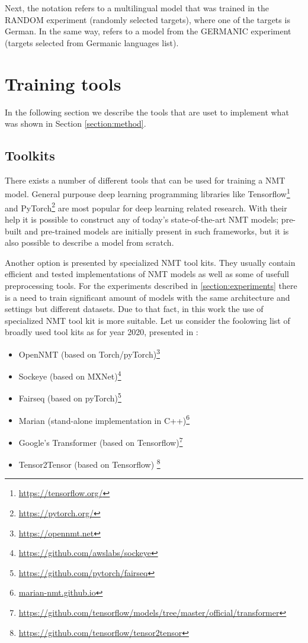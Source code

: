 Next, the  notation refers to a multilingual
model that was trained in the RANDOM experiment (randomly selected targets),
where one of the targets is German.
In the same way,  refers to a model from
the GERMANIC experiment (targets selected from Germanic languages list).


\section{Training tools}

In the following section we describe the tools that are uset to implement
what was shown in Section \ref{section:method}.

\subsection{Toolkits}

There exists a number of different tools that can be used for training a NMT model.
General purpouse deep learning programming libraries like
Tensorflow\footnote{\url{https://tensorflow.org/}} and
PyTorch\footnote{\url{https://pytorch.org/}} are most popular for deep learning related
research. With their help it is possible to construct any of today's state-of-the-art
NMT models; pre-built and pre-trained models are initially present in such frameworks,
but it is also possible to describe a model from scratch.

Another option is presented by specialized NMT tool kits.
They usually contain efficient and tested implementations of NMT models as well as some of
usefull preprocessing tools.
For the experiments described in \ref{section:experiments} there is a need to train significant
amount of models with the same architecture and settings but different datasets.
Due to that fact, in this work the use of specialized NMT tool kit is more suitable.
Let us consider the foolowing list of broadly used tool kits as for year 2020,
presented in \cite{koehn_2020}:

\begin{itemize}
  \item OpenNMT (based on Torch/pyTorch)\footnote{\url{https://opennmt.net}}
  \item Sockeye (based on MXNet)\footnote{\url{https://github.com/awslabs/sockeye}}
  \item Fairseq (based on pyTorch)\footnote{\url{https://github.com/pytorch/fairseq}}
  \item Marian (stand-alone implementation in C++)\footnote{\url{marian-nmt.github.io}}
  \item Google's Transformer (based on Tensorflow)\footnote{\url{
    https://github.com/tensorflow/models/tree/master/official/transformer}}
  \item Tensor2Tensor (based on Tensorflow) \footnote{\url{
    https://github.com/tensorflow/tensor2tensor}}
\end{itemize}

